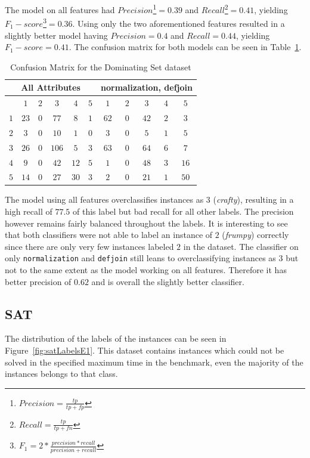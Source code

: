 \par The model on all features had $Precision$\footnote{$Precision=\frac{tp}{tp+fp}$}$=0.39$ and $Recall$\footnote{$Recall=\frac{tp}{tp+fn}$}$=0.41$, yielding $F_1-score$\footnote{$F_1=2*\frac{precision*recall}{precision+recall}$}$=0.36$.
Using only the two aforementioned features resulted in a slightly better model having $Precision=0.4$ and $Recall=0.44$, yielding $F_1-score=0.41$. The confusion matrix for both models can be seen in Table~\ref{tbl:dsCME1}. 
\begin{table}[h]
\center
	\begin{tabular}{|c|ccccc|ccccc|}
		\hline
		\multicolumn{6}{|c|}{All Attributes} &\multicolumn{5}{|c|}{normalization, defjoin}\\
		\hline &$1$&$2$&$3$&$4$&$5$&$1$&$2$&$3$&$4$&$5$\\
		 \hline$1$&$23$&$0$&$77$ &$8$ &$1$&$62$&$0$&$42$&$2$&$3$\\
		 $2$&$3$ &$0$&$10$ &$1$ &$0$&$3$ &$0$&$5$ &$1$&$5$\\
		 $3$&$26$&$0$&$106$&$5$ &$3$&$63$&$0$&$64$&$6$&$7$\\
		 $4$&$9$ &$0$&$42$ &$12$&$5$&$1$ &$0$&$48$&$3$&$16$\\
		 $5$&$14$&$0$&$27$ &$30$&$3$&$2$ &$0$&$21$&$1$&$50$\\
		 \hline
	\end{tabular}
	\caption{Confusion Matrix for the Dominating Set dataset}
	\label{tbl:dsCME1}
\end{table}
\par The model using all features overclassifies instances as $3$ (\emph{crafty}), resulting in a high recall of $77.5$ of this label but bad recall for all other labels. The precision however remains fairly balanced throughout the labels. It is interesting to see that both classifiers were not able to label an instance of $2$ (\emph{frumpy}) correctly since there are only very few instances labeled $2$ in the dataset. The classifier on only \lstinline$normalization$ and \lstinline$defjoin$ still leans to overclassifying instances as $3$ but not to the same extent as the model working on all features.
Therefore it has better precision of $0.62$ and is overall the slightly better classifier.

\subsection{SAT}
The distribution of the labels of the instances can be seen in Figure~\ref{fig:satLabelsE1}. This dataset contains instances which could not be solved in the specified maximum time in the benchmark, even the majority of the instances belongs to that class. 


